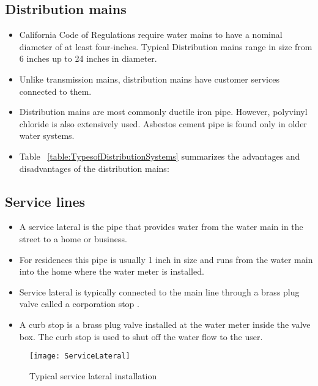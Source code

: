\subsection{Distribution mains}
\begin{itemize}
\item California Code of Regulations require water mains to have a nominal diameter of at least four-inches.  Typical Distribution mains range in size from 6
inches up to 24 inches in diameter. 
\item Unlike transmission mains, distribution mains have customer services connected to them. 
\item Distribution mains are most commonly ductile iron pipe. However, polyvinyl chloride is also extensively used. Asbestos cement pipe is found only in older water systems.

\item Table ~\ref{table:TypesofDistributionSystems} summarizes the advantages and disadvantages of the distribution mains:
\end{itemize}

\subsection{Service lines}
\begin{itemize}
\item A service lateral is the pipe that provides water from the water main in the street to a home or business. 
\item For residences this pipe is usually 1 inch in size and runs from the water main into the home where the water meter is installed. 
\item Service lateral is typically connected to the main line through a brass plug valve called a corporation stop . 
\item A curb stop  is a brass plug valve installed at the water meter inside the valve box.  The curb stop is used to shut off the water flow to the user.
\end{itemize}
\begin{figure}[h]
\begin{center}
        \texttt{[image: ServiceLateral]}
        \caption{Typical service lateral installation}
\end{center}
\end{figure}


